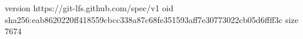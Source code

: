 version https://git-lfs.github.com/spec/v1
oid sha256:eab8620220ff418559cbcc338a87c68fe351593aff7e30773022cb05d6ffff3c
size 7674
